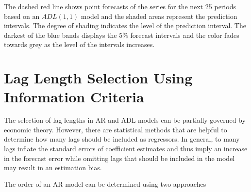 \documentclass[]{book}
\theoremstyle{definition}
\theoremstyle{definition}
\theoremstyle{definition}
\theoremstyle{remark}
\begin{document}
The dashed red line shows point forecasts of the series for the next 25
periods based on an \(ADL(1,1)\) model and the shaded areas represent
the prediction intervals. The degree of shading indicates the level of
the prediction interval. The darkest of the blue bands displays the
\(5\%\) forecast intervals and the color fades towards grey as the level
of the intervals increases.

\section{Lag Length Selection Using Information
Criteria}\label{lag-length-selection-using-information-criteria}

The selection of lag lengths in AR and ADL models can be partially
governed by economic theory. However, there are statistical methods that
are helpful to determine how many lags should be included as regressors.
In general, to many lags inflate the standard errors of coefficient
estimates and thus imply an increase in the forecast error while
omitting lags that should be included in the model may result in an
estimation bias.

The order of an AR model can be determined using two approaches
\end{document}
